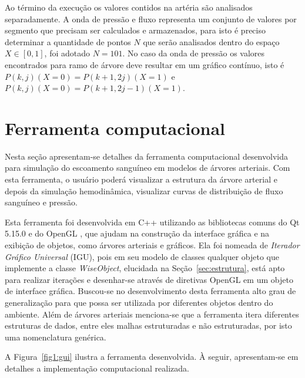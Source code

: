 \documentclass[
        english,			
        brazil			        %
        ,<...>]{abntbibufjf}
\begin{document}
Ao término da execução os valores contidos na artéria são analisados separadamente. A onda de pressão e fluxo representa um conjunto de valores por segmento que precisam ser calculados e armazenados, para isto é preciso determinar a quantidade de pontos $N$ que serão analisados dentro do espaço $X \in [0,1]$, foi adotado $N = 101$. No caso da onda de pressão os valores encontrados para ramo de árvore deve resultar em um gráfico contínuo, isto é $P(k,j)(X=0) = P(k+1,2j)(X=1)$ e $P(k,j)(X=0) = P(k+1,2j-1)(X=1)$.
	
\chapter{Ferramenta computacional}\label{sec:modelagem}

Nesta seção apresentam-se detalhes da ferramenta computacional desenvolvida para simulação do escoamento sanguíneo em modelos de árvores arteriais. Com esta ferramenta, o usuário poderá  visualizar a estrutura da árvore arterial e depois da simulação hemodinâmica, visualizar curvas de distribuição de fluxo sanguíneo e pressão.

Esta ferramenta foi desenvolvida em C++ utilizando as bibliotecas comuns do Qt 5.15.0 \cite{QTClasses} e do OpenGL \cite{OpenGL}, que ajudam na construção da interface gráfica e na exibição de objetos, como árvores arteriais e gráficos. Ela foi nomeada de \textit{Iterador Gráfico Universal} (IGU), pois em seu modelo de classes qualquer objeto que implemente a classe \textit{WiseObject}, elucidada na Seção~\ref{sec:estrutura}, está apto para realizar iterações e desenhar-se através de diretivas OpenGL em um objeto de interface gráfica. Buscou-se no desenvolvimento desta ferramenta alto grau de generalização para que possa ser utilizada por diferentes objetos dentro do ambiente. Além de árvores arteriais menciona-se que a ferramenta itera diferentes estruturas de dados, entre eles malhas estruturadas e não estruturadas, por isto uma nomenclatura genérica.

A Figura~\ref{fig1:gui} ilustra a ferramenta desenvolvida. À seguir, apresentam-se em detalhes a implementação computacional realizada.
\end{document}
